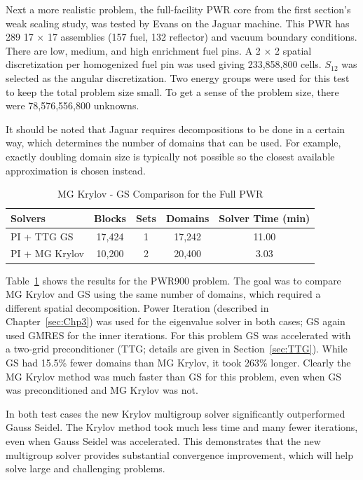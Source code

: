 Next a more realistic problem, the full-facility PWR core from the first section's weak scaling study, was tested by Evans on the Jaguar machine. This PWR has 289 17 $\times$ 17 assemblies (157 fuel, 132 reflector) and vacuum boundary conditions. There are low, medium, and high enrichment fuel pins. A 2 $\times$ 2 spatial discretization per homogenized fuel pin was used giving 233,858,800 cells. $S_{12}$ was selected as the angular discretization. Two energy groups were used for this test to keep the total problem size small. To get a sense of the problem size, there were 78,576,556,800 unknowns.

It should be noted that Jaguar requires decompositions to be done in a certain way, which determines the number of domains that can be used. For example, exactly doubling domain size is typically not possible so the closest available approximation is chosen instead.

\begin{table}[!h]
\caption{MG Krylov - GS Comparison for the Full PWR}
\begin{center}
\begin{tabular}{l c c c c}
\hline
Solvers & Blocks & Sets & Domains & Solver Time (min) \\[0.5ex]
\hline
PI + TTG GS & 17,424 & 1 & 17,242 & 11.00 \\
PI + MG Krylov & 10,200 & 2 & 20,400 & 3.03 \\
\hline
\end{tabular}
\end{center}
\label{table:MGkrylovPWR}
\end{table}
%
Table~\ref{table:MGkrylovPWR} shows the results for the PWR900 problem. The goal was to compare MG Krylov and GS using the same number of domains, which required a different spatial decomposition. Power Iteration (described in Chapter~\ref{sec:Chp3}) was used for the eigenvalue solver in both cases; GS again used GMRES for the inner iterations. For this problem GS was accelerated with a two-grid preconditioner (TTG; details are given in Section~\ref{sec:TTG}). While GS had 15.5\% fewer domains than MG Krylov, it took 263\% longer. Clearly the MG Krylov method was much faster than GS for this problem, even when GS was preconditioned and MG Krylov was not. 

In both test cases the new Krylov multigroup solver significantly outperformed Gauss Seidel. The Krylov method took much less time and many fewer iterations, even when Gauss Seidel was accelerated. This demonstrates that the new multigroup solver provides substantial convergence improvement, which will help solve large and challenging problems. 

